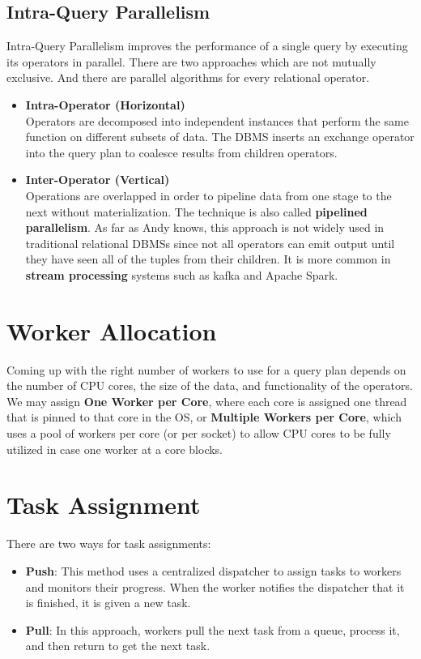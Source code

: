 \documentclass[11pt]{article}
\begin{document}
\subsection*{Intra-Query Parallelism}
Intra-Query Parallelism improves the performance of a single query by executing its operators in 
parallel. There are two approaches which are not mutually exclusive. And there are parallel 
algorithms for every relational operator.
\begin{itemize}
    \item \textbf{Intra-Operator (Horizontal)}\\
    Operators are decomposed into independent instances that perform the same function on different 
    subsets of data. The DBMS inserts an exchange operator into the query plan to coalesce results 
    from children operators.
    \item \textbf{Inter-Operator (Vertical)}\\
    Operations are overlapped in order to pipeline data from one stage to the next without 
    materialization. The technique is also called \textbf{pipelined parallelism}. As far as Andy 
    knows, this approach is not widely used in traditional relational DBMSs since not all operators 
    can emit output until they have seen all of the tuples from their children. It is more common in 
    \textbf{stream processing} systems such as kafka and Apache Spark.
\end{itemize}

\section*{Worker Allocation}
Coming up with the right number of workers to use for a query plan depends on the number of CPU 
cores, the size of the data, and functionality of the operators. 
We may assign \textbf{One Worker per Core}, where each core is assigned one thread that is pinned to 
that core in the OS, or \textbf{Multiple Workers per Core}, which uses a pool of workers per core (or 
per socket) to allow CPU cores to be fully utilized in case one worker at a core blocks.

\section*{Task Assignment}
There are two ways for task assignments:
\begin{itemize}
    \item \textbf{Push}: 
    This method uses a centralized dispatcher to assign tasks to workers and monitors their progress. 
    When the worker notifies the dispatcher that it is finished, it is given a new task.
    \item \textbf{Pull}: 
    In this approach, workers pull the next task from a queue, process it, and then return to get the 
    next task.
\end{itemize}

\newpage


\end{document}
